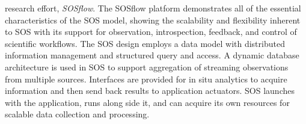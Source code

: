 research effort, \textit{SOSflow}.
%
The SOSflow platform demonstrates all of the essential characteristics
of the SOS model, showing the scalability and flexibility inherent to
SOS with its support for observation, introspection, feedback, and
control of scientific workflows.
%
The SOS design employs a data model with distributed
information management and structured query and access.
%
A dynamic database architecture is used in SOS to support aggregation
of streaming observations from multiple sources.
%
%
Interfaces are provided for in situ analytics to acquire
information and then send back results to application actuators.
%
SOS launches with the application, runs along side it, and can acquire
its own resources for scalable data collection and processing.
%


